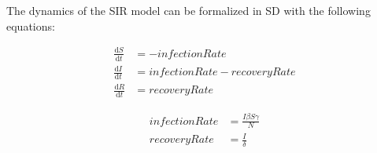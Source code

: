 The dynamics of the SIR model can be formalized in SD with the following equations:


\begin{align}
\frac{\mathrm d S}{\mathrm d t} &= -infectionRate \\ 
\frac{\mathrm d I}{\mathrm d t} &= infectionRate - recoveryRate \\ 
\frac{\mathrm d R}{\mathrm d t} &= recoveryRate 
\end{align}

\begin{align}
infectionRate &= \frac{I \beta S \gamma}{N} \\
recoveryRate &= \frac{I}{\delta} 
\end{align}


